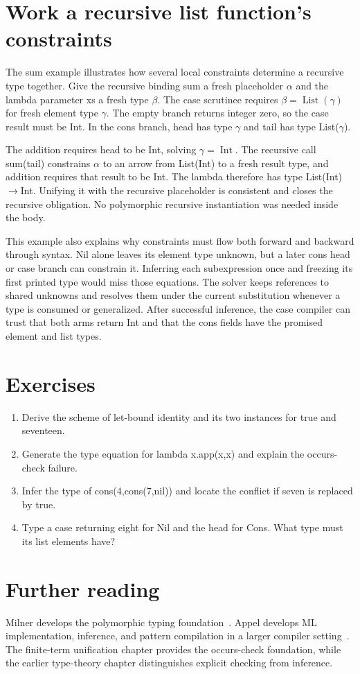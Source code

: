 \section{Work a recursive list function's constraints}
\label{sec:ch90-sum-constraints}
The sum example illustrates how several local constraints determine a recursive type together.
Give the recursive binding sum a fresh placeholder $\alpha$ and the lambda parameter xs a fresh type $\beta$.
The case scrutinee requires $\beta=\operatorname{List}(\gamma)$ for fresh element type $\gamma$.
The empty branch returns integer zero, so the case result must be Int.
In the cons branch, head has type $\gamma$ and tail has type List($\gamma$).

The addition requires head to be Int, solving $\gamma=\operatorname{Int}$.
The recursive call sum(tail) constrains $\alpha$ to an arrow from List(Int) to a fresh result type, and addition requires that result to be Int.
The lambda therefore has type List(Int)$\to$Int.
Unifying it with the recursive placeholder is consistent and closes the recursive obligation.
No polymorphic recursive instantiation was needed inside the body.

This example also explains why constraints must flow both forward and backward through syntax.
Nil alone leaves its element type unknown, but a later cons head or case branch can constrain it.
Inferring each subexpression once and freezing its first printed type would miss those equations.
The solver keeps references to shared unknowns and resolves them under the current substitution whenever a type is consumed or generalized.
After successful inference, the case compiler can trust that both arms return Int and that the cons fields have the promised element and list types.

\section{Exercises}
\label{sec:ch90-exercises}
\begin{enumerate}
\item\label{ex:ch90-id} Derive the scheme of let-bound identity and its two instances for true and seventeen.
\item\label{ex:ch90-self} Generate the type equation for lambda x.app(x,x) and explain the occurs-check failure.
\item\label{ex:ch90-list} Infer the type of cons(4,cons(7,nil)) and locate the conflict if seven is replaced by true.
\item\label{ex:ch90-case} Type a case returning eight for Nil and the head for Cons.
What type must its list elements have?
\end{enumerate}

\section{Further reading}
\label{sec:ch90-reading}
Milner develops the polymorphic typing foundation~\cite{milner-1978-polymorphism}.
Appel develops ML implementation, inference, and pattern compilation in a larger compiler setting~\cite{appel-1998-modern}.
The finite-term unification chapter provides the occurs-check foundation, while the earlier type-theory chapter distinguishes explicit checking from inference.
